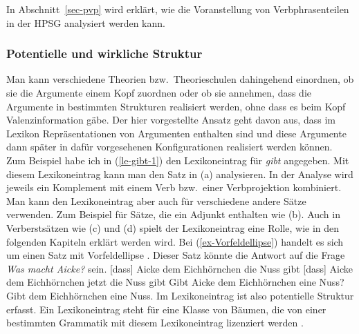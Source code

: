 In Abschnitt~\ref{sec-pvp} wird erklärt, wie die Voranstellung von Verbphrasenteilen in der HPSG
analysiert werden kann.


\subsubsection{Potentielle und wirkliche Struktur}

Man kann verschiedene Theorien bzw.\ Theorieschulen dahingehend einordnen, ob sie die Argumente
einem Kopf zuordnen oder ob sie annehmen, dass die Argumente in bestimmten Strukturen realisiert
werden, ohne dass es beim Kopf Valenzinformation gäbe. Der hier vorgestellte Ansatz geht davon aus, dass im Lexikon Repräsentationen von Argumenten
enthalten sind und diese Argumente dann später in dafür vorgesehenen Konfigurationen realisiert
werden können. Zum Beispiel habe ich in (\ref{le-gibt-1}) den Lexikoneintrag für \emph{gibt} angegeben. Mit
diesem Lexikoneintrag kann man den Satz in (a) analysieren. In der
Analyse wird jeweils ein Komplement mit einem Verb bzw.\ einer Verbprojektion kombiniert. Man kann den Lexikoneintrag aber auch
für verschiedene andere Sätze verwenden. Zum Beispiel für Sätze, die ein Adjunkt enthalten wie
(b). Auch in Verberstsätzen wie (c) und (d) spielt der Lexikoneintrag eine
Rolle, wie in den folgenden Kapiteln erklärt werden wird. Bei (\ref{ex-Vorfeldellipse}) handelt es sich um einen Satz mit Vorfeldellipse \parencites[Abschnitt~1.5]{Huang84}{Fries88b}[574--576, Abschnitt~4.1.1.1]{Hoffmann97a}. Dieser Satz könnte die
Antwort auf die Frage \emph{Was macht Aicke?} sein.
\eal
\ex {}[dass] Aicke dem Eichhörnchen die Nuss gibt
\ex {}[dass] Aicke dem Eichhörnchen jetzt die Nuss gibt
\ex {}Gibt Aicke dem Eichhörnchen eine Nuss?
\ex
\label{ex-Vorfeldellipse}
Gibt dem Eichhörnchen eine Nuss.
\zl
Im Lexikoneintrag ist also potentielle Struktur erfasst. Ein Lexikoneintrag steht für eine Klasse
von Bäumen, die von einer bestimmten Grammatik mit diesem Lexikoneintrag lizenziert werden
\parencites{MuellerPotentialStructure}[Kapitel~22]{MuellerGT-Eng5}.

